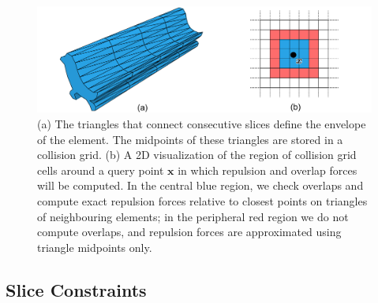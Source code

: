 \begin{figure}
\centering
\includegraphics[width=1.0\textwidth]{figures/animationpak/collision_grid.pdf} 
\caption[An envelope and a collision grid]
{\label{fig_animationpak_collision_grid} 
(a) The triangles that connect consecutive slices define the envelope of the
element.  The midpoints of these triangles are stored in a collision grid.
(b) A 2D visualization of the region of collision
grid cells around a query point 
$\bm{x}$ 
in which repulsion and overlap forces will be computed.  In the central blue
region, we check overlaps and compute exact repulsion forces relative to
closest points on triangles of neighbouring elements; in the peripheral
red region we do not compute overlaps, and repulsion forces are approximated
using triangle midpoints only.}
\end{figure}


\subsection{Slice Constraints}
\label{animationpak_slice_constraints}


